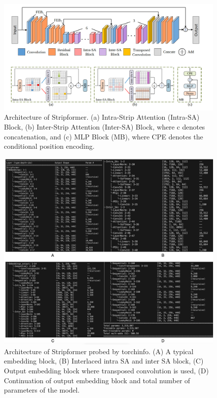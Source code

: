 \documentclass[12pt, a4paper, twoside]{article}
\begin{document}
			\begin{figure}[hbt!]
				\centering
				\includegraphics[width=\textwidth]{arc-1}
				\caption{Architecture of Stripformer. (a) Intra-Strip Attention (Intra-SA) Block, (b) Inter-Strip Attention (Inter-SA) Block, where c denotes concatenation, and (c) MLP Block (MB), where CPE denotes the conditional position encoding.}
				\label{F:arc-1}
			\end{figure}
			\begin{figure}[hbt!]
				\centering
				\includegraphics[width=\textwidth]{arc-2}
				\caption{Architecture of Stripformer probed by torchinfo. (A)  A typical embedding block, (B) Interlaced intra SA and inter SA block, (C) Output embedding block where transposed convolution is used, (D) Continuation of output embedding block and total number of parameters of the model.}
				\label{F:arc-2}
			\end{figure}
			
\end{document}

